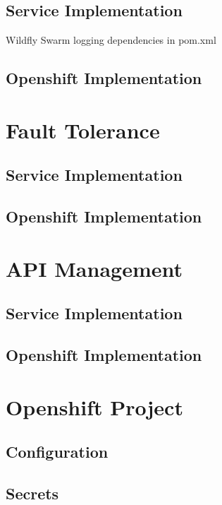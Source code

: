 \subsection{Service Implementation}
\label{sec:esbi-logging-service}
 
\begin{listing}
	\caption{Wildfly Swarm logging dependencies in pom.xml}
	\label{ls:esboi-logging-pom}
\end{listing}

\subsection{Openshift Implementation}
\label{sec:esbi-logging-openshift}

\section{Fault Tolerance}
\label{sec:esbi-fault}

\subsection{Service Implementation}
\label{sec:esbi-fault-service}

\subsection{Openshift Implementation}
\label{sec:esbi-fault-openshift}

\section{API Management}
\label{sec:esbi-api}

\subsection{Service Implementation}
\label{sec:esbi-api-service}

\subsection{Openshift Implementation}
\label{sec:esbi-api-openshift}

\section{Openshift Project}
\label{sec:esbi-openshift}

\subsection{Configuration}
\label{sec:esbi-openshift-config}

\subsection{Secrets}
\label{sec:esbi-openshift-secrets}

